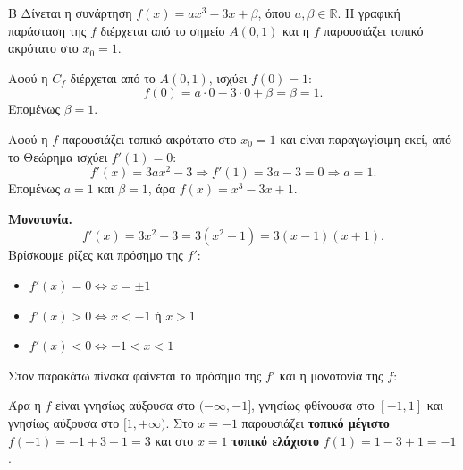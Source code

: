 \begin{thema}{Β}
Δίνεται η συνάρτηση $f(x) = ax^3 - 3x + \beta$, όπου $a, \beta \in \mathbb{R}$. Η γραφική παράσταση της $f$ διέρχεται από το σημείο $A(0,1)$ και η $f$ παρουσιάζει τοπικό ακρότατο στο $x_0 = 1$.

\begin{erwthma}

\item Αφού η $C_f$ διέρχεται από το $A(0,1)$, ισχύει $f(0) = 1$:
\[
f(0) = a\cdot0 - 3\cdot0 + \beta = \beta = 1.
\]
Επομένως $\beta = 1$.

Αφού η $f$ παρουσιάζει τοπικό ακρότατο στο $x_0 = 1$ και είναι παραγωγίσιμη εκεί, από το Θεώρημα  ισχύει $f'(1) = 0$:
\[
f'(x) = 3ax^2 - 3 \Rightarrow f'(1) = 3a - 3 = 0 \Rightarrow a = 1.
\]
Επομένως $a = 1$ και $\beta = 1$, άρα $f(x) = x^3 - 3x + 1$.

\item \textbf{Μονοτονία.}
\[
f'(x) = 3x^2 - 3 = 3(x^2 - 1) = 3(x-1)(x+1).
\]
Βρίσκουμε ρίζες και πρόσημο της $f'$:
\begin{itemize}
    \item $f'(x) = 0 \Leftrightarrow x = \pm 1$
    \item $f'(x) > 0 \Leftrightarrow x < -1$ ή $x > 1$
    \item $f'(x) < 0 \Leftrightarrow -1 < x < 1$
\end{itemize}
Στον παρακάτω πίνακα φαίνεται το πρόσημο της $f'$ και η μονοτονία της $f$:
\begin{center}
\end{center}
Άρα η $f$ είναι γνησίως αύξουσα στο $(-\infty,-1]$, γνησίως φθίνουσα στο $[-1,1]$ και γνησίως αύξουσα στο $[1,+\infty)$.
Στο $x=-1$ παρουσιάζει \textbf{τοπικό μέγιστο} $f(-1) = -1+3+1 = 3$ και στο $x=1$ \textbf{τοπικό ελάχιστο} $f(1) = 1-3+1 = -1$.


\end{erwthma}
\end{thema}
